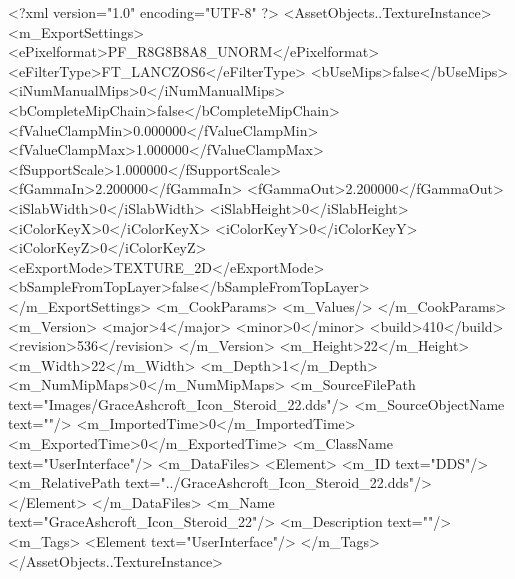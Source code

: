 <?xml version="1.0" encoding="UTF-8" ?>
<AssetObjects..TextureInstance>
	<m_ExportSettings>
		<ePixelformat>PF_R8G8B8A8_UNORM</ePixelformat>
		<eFilterType>FT_LANCZOS6</eFilterType>
		<bUseMips>false</bUseMips>
		<iNumManualMips>0</iNumManualMips>
		<bCompleteMipChain>false</bCompleteMipChain>
		<fValueClampMin>0.000000</fValueClampMin>
		<fValueClampMax>1.000000</fValueClampMax>
		<fSupportScale>1.000000</fSupportScale>
		<fGammaIn>2.200000</fGammaIn>
		<fGammaOut>2.200000</fGammaOut>
		<iSlabWidth>0</iSlabWidth>
		<iSlabHeight>0</iSlabHeight>
		<iColorKeyX>0</iColorKeyX>
		<iColorKeyY>0</iColorKeyY>
		<iColorKeyZ>0</iColorKeyZ>
		<eExportMode>TEXTURE_2D</eExportMode>
		<bSampleFromTopLayer>false</bSampleFromTopLayer>
	</m_ExportSettings>
	<m_CookParams>
		<m_Values/>
	</m_CookParams>
	<m_Version>
		<major>4</major>
		<minor>0</minor>
		<build>410</build>
		<revision>536</revision>
	</m_Version>
	<m_Height>22</m_Height>
	<m_Width>22</m_Width>
	<m_Depth>1</m_Depth>
	<m_NumMipMaps>0</m_NumMipMaps>
	<m_SourceFilePath text="Images/GraceAshcroft_Icon_Steroid_22.dds"/>
	<m_SourceObjectName text=""/>
	<m_ImportedTime>0</m_ImportedTime>
	<m_ExportedTime>0</m_ExportedTime>
	<m_ClassName text="UserInterface"/>
	<m_DataFiles>
		<Element>
			<m_ID text="DDS"/>
			<m_RelativePath text="../GraceAshcroft_Icon_Steroid_22.dds"/>
		</Element>
	</m_DataFiles>
	<m_Name text="GraceAshcroft_Icon_Steroid_22"/>
	<m_Description text=""/>
	<m_Tags>
		<Element text="UserInterface"/>
	</m_Tags>
</AssetObjects..TextureInstance>
